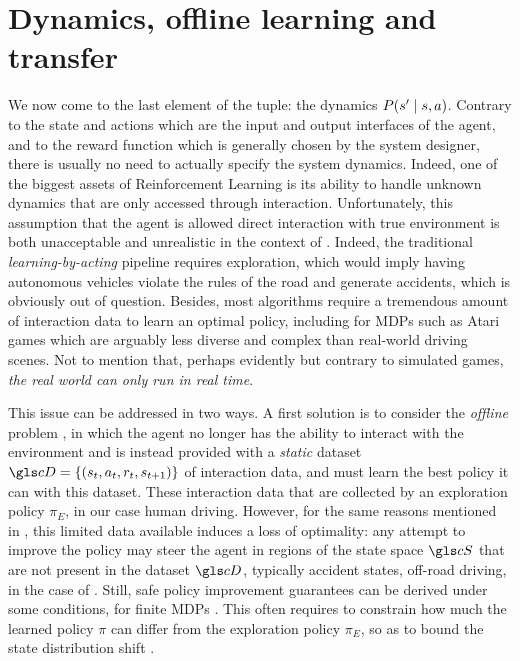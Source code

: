 \section{Dynamics, offline learning and transfer}

We now come to the last element of the  tuple: the dynamics $P\lparen s'\mid s,a\rparen$. Contrary to the state and actions which are the input and output interfaces of the agent, and to the reward function which is generally chosen by the system designer, there is usually no need to actually specify the system dynamics. Indeed, one of the biggest assets of Reinforcement Learning is its ability to handle unknown dynamics that are only accessed through interaction. Unfortunately, this assumption that the agent is allowed direct interaction with true environment is both unacceptable and unrealistic in the context of . Indeed, the traditional \emph{learning-by-acting} pipeline requires exploration, which would imply having autonomous vehicles violate the rules of the road and generate accidents, which is obviously out of question. Besides, most  algorithms require a tremendous amount of interaction data to learn an optimal policy, including for \acp*{MDP} such as Atari games which are arguably less diverse and complex than real-world driving scenes. Not to mention that, perhaps evidently but contrary to simulated games, \emph{the real world can only run in real time}.

This issue can be addressed in two ways. A first solution is to consider the \emph{offline}  problem \citep{levine2020offline}, in which the agent no longer has the ability to interact with the environment and is instead provided with a \emph{static} dataset $\cD = \{(s_t, a_t, r_t, s_{t+1})\}$ of interaction data, and must learn the best policy it can with this dataset. These interaction data that are collected by an exploration policy $\pi_E$, in our case human driving. However, for the same reasons mentioned in , this limited data available induces a loss of optimality: any attempt to improve the policy may steer the agent in regions of the state space $\cS$ that are not present in the dataset $\cD$, typically accident states, off-road driving, \etc in the case of . Still, safe policy improvement guarantees can be derived under some conditions, \eg for finite \acp*{MDP} \citep{Laroche2019,Nadjahi2019}. This often requires to constrain how much the learned policy $\pi$ can differ from the exploration policy $\pi_E$, so as to bound the state distribution shift \citep{Kakade2002,Schulman2015}.

